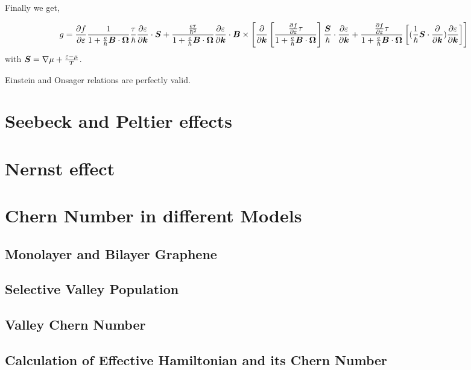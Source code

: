 \documentclass{report}
\renewcommand\vec[1]{\ensuremath\boldsymbol{#1}} %
\begin{document}
Finally we get,

\begin{equation}
g = \frac{\partial f} {\partial \varepsilon}\frac{1}{1 + \frac{e}{\hbar} \vec{B}\cdot\vec{\Omega}}
\frac{\tau}{\hbar} \frac{\partial \varepsilon}{\partial \vec{k}}\cdot  \vec{S} + \frac{\frac{e \tau}{\hbar^2} }{1 + \frac{e}{\hbar} \vec{B}\cdot\vec{\Omega}} \frac{\partial \varepsilon}{\partial \vec{k}} \cdot \vec{B} \times \left[ \frac{\partial}{\partial \vec{k}} \left[ \frac{\frac{\partial f} {\partial \varepsilon} \tau}{1 + \frac{e}{\hbar} \vec{B}\cdot\vec{\Omega}}
\right] \frac{\vec{S}}{\hbar} \cdot \frac{\partial \varepsilon}{\partial \vec{k}} + \frac{\frac{\partial f} {\partial \varepsilon} \tau}{1 + \frac{e}{\hbar} \vec{B}\cdot\vec{\Omega}} \left[(\frac{1}{\hbar} \vec{S}\cdot \frac{\partial }{\partial \vec{k}} )\frac{\partial \varepsilon}{\partial \vec{k}} \right] \right]
\end{equation}\label{Eq:g_non_zero_chem_temp_grad}
with $\vec{S} = \nabla \mu + \frac{\varepsilon - \mu}{T}$.

Einstein and Onsager relations are perfectly valid.


\section{Seebeck and Peltier effects}
\section{Nernst effect}
\section{Chern Number in different Models}
\subsection{Monolayer and Bilayer Graphene}
\subsection{Selective Valley Population}
\subsection{Valley Chern Number}
\subsection{Calculation of Effective Hamiltonian and its Chern Number}
\end{document}
